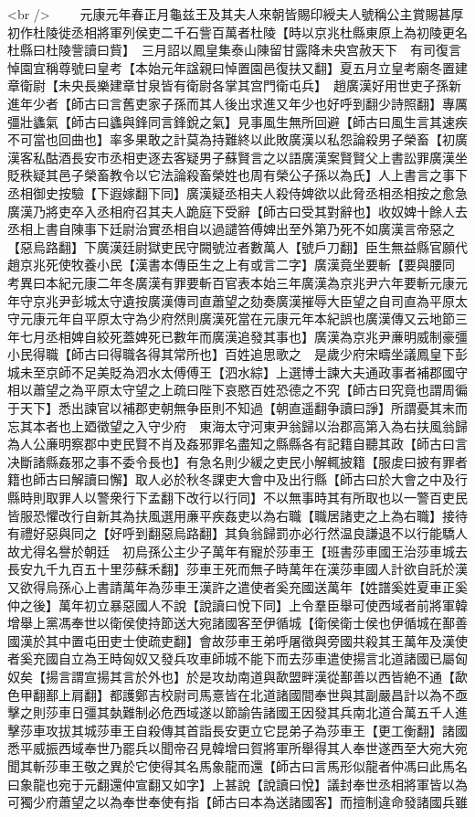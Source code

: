 <br />
　　元康元年春正月龜兹王及其夫人來朝皆賜印綬夫人號稱公主賞賜甚厚初作杜陵徙丞相將軍列侯吏二千石訾百萬者杜陵【時以京兆杜縣東原上為初陵更名杜縣曰杜陵訾讀曰貲】　三月詔以鳳皇集泰山陳留甘露降未央宫赦天下　有司復言悼園宜稱尊號曰皇考【本始元年諡親曰悼置園邑復扶又翻】夏五月立皇考廟冬置建章衛尉【未央長樂建章甘泉皆有衛尉各掌其宫門衛屯兵】　趙廣漢好用世吏子孫新進年少者【師古曰言舊吏家子孫而其人後出求進又年少也好呼到翻少詩照翻】專厲彊壯蠭氣【師古曰蠭與鋒同言鋒銳之氣】見事風生無所回避【師古曰風生言其速疾不可當也回曲也】率多果敢之計莫為持難終以此敗廣漢以私怨論殺男子榮畜【初廣漢客私酤酒長安市丞相吏逐去客疑男子蘇賢言之以語廣漢案賢賢父上書訟罪廣漢坐貶秩疑其邑子榮畜教令以它法論殺畜榮姓也周有榮公子孫以為氏】人上書言之事下丞相御史按驗【下遐嫁翻下同】廣漢疑丞相夫人殺侍婢欲以此脅丞相丞相按之愈急廣漢乃將吏卒入丞相府召其夫人跪庭下受辭【師古曰受其對辭也】收奴婢十餘人去丞相上書自陳事下廷尉治實丞相自以過譴笞傅婢出至外第乃死不如廣漢言帝惡之【惡烏路翻】下廣漢廷尉獄吏民守闕號泣者數萬人【號戶刀翻】臣生無益縣官願代趙京兆死使牧養小民【漢書本傳臣生之上有或言二字】廣漢竟坐要斬【要與腰同　考異曰本紀元康二年冬廣漢有罪要斬百官表本始三年廣漢為京兆尹六年要斬元康元年守京兆尹彭城太守遺按廣漢傳司直蕭望之劾奏廣漢摧辱大臣望之自司直為平原太守元康元年自平原太守為少府然則廣漢死當在元康元年本紀誤也廣漢傳又云地節三年七月丞相婢自絞死蓋婢死已數年而廣漢追發其事也】廣漢為京兆尹亷明威制豪彊小民得職【師古曰得職各得其常所也】百姓追思歌之　是歲少府宋疇坐議鳳皇下彭城未至京師不足美貶為泗水太傅傅王【泗水綜】上選博士諫大夫通政事者補郡國守相以蕭望之為平原太守望之上疏曰陛下哀愍百姓恐德之不究【師古曰究竟也謂周徧于天下】悉出諫官以補郡吏朝無争臣則不知過【朝直遥翻争讀曰諍】所謂憂其末而忘其本者也上廼徵望之入守少府　東海太守河東尹翁歸以治郡高第入為右扶風翁歸為人公亷明察郡中吏民賢不肖及姦邪罪名盡知之縣縣各有記籍自聽其政【師古曰言决斷諸縣姦邪之事不委令長也】有急名則少緩之吏民小解輒披籍【服䖍曰披有罪者籍也師古曰解讀曰懈】取人必於秋冬課吏大會中及出行縣【師古曰於大會之中及行縣時則取罪人以警衆行下孟翻下改行以行同】不以無事時其有所取也以一警百吏民皆服恐懼改行自新其為扶風選用亷平疾姦吏以為右職【職居諸吏之上為右職】接待有禮好惡與同之【好呼到翻惡烏路翻】其負翁歸罰亦必行然温良謙退不以行能驕人故尤得名譽於朝廷　初烏孫公主少子萬年有寵於莎車王【班書莎車國王治莎車城去長安九千九百五十里莎蘇禾翻】莎車王死而無子時萬年在漢莎車國人計欲自託於漢又欲得烏孫心上書請萬年為莎車王漢許之遣使者奚充國送萬年【姓譜奚姓夏車正奚仲之後】萬年初立暴惡國人不說【說讀曰悅下同】上令羣臣舉可使西域者前將軍韓增舉上黨馮奉世以衛侯使持節送大宛諸國客至伊循城【衛侯衛士侯也伊循城在鄯善國漢於其中置屯田吏士使疏吏翻】會故莎車王弟呼屠徵與旁國共殺其王萬年及漢使者奚充國自立為王時匈奴又發兵攻車師城不能下而去莎車遣使揚言北道諸國已屬匈奴矣【揚言謂宣揚其言於外也】於是攻劫南道與歃盟畔漢從鄯善以西皆絶不通【歃色甲翻鄯上肩翻】都護鄭吉校尉司馬憙皆在北道諸國間奉世與其副嚴昌計以為不亟擊之則莎車日彊其埶難制必危西域遂以節諭告諸國王因發其兵南北道合萬五千人進擊莎車攻拔其城莎車王自殺傳其首詣長安更立它昆弟子為莎車王【更工衡翻】諸國悉平威振西域奉世乃罷兵以聞帝召見韓增曰賀將軍所舉得其人奉世遂西至大宛大宛聞其斬莎車王敬之異於它使得其名馬象龍而還【師古曰言馬形似龍者仲馮曰此馬名曰象龍也宛于元翻還仲宣翻又如字】上甚說【說讀曰悅】議封奉世丞相將軍皆以為可獨少府蕭望之以為奉世奉使有指【師古曰本為送諸國客】而擅制違命發諸國兵雖
